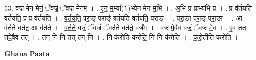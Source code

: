 \documentclass[17pt]{extarticle}
\begin{document}
53. वज्र॑ मेन मेनं॒ ॅवज्रं॒ ॅवज्र॑ मेनम् । . ए॒न॒ म॒भ्या᳚(1॒)भ्ये॑न मेन म॒भि । . अ॒भि प्र प्राभ्य॑भि प्र । . प्र व॑र्तयति वर्तयति॒ प्र प्र व॑र्तयति । . व॒र्त॒य॒ति॒ परा॒ङ् पराङ्॑ वर्तयति वर्तयति॒ पराङ्॑ । . परा॒ङा परा॒ङ् परा॒ङा । . आ व॑र्तते वर्तत॒ आ व॑र्तते । . व॒र्त॒ते॒ वज्रं॒ ॅवज्रं॑ ॅवर्तते वर्तते॒ वज्र᳚म् । . वज्र॑ मे॒वैव वज्रं॒ ॅवज्र॑ मे॒व । . ए॒व तत् तदे॒वैव तत् । . तन् नि नि तत् तन् नि । . नि क॑रोति करोति॒ नि नि क॑रोति । . क॒रो॒तीति॑ करोति । \newline

\textbf{Ghana Paata } \newline
\end{document}
